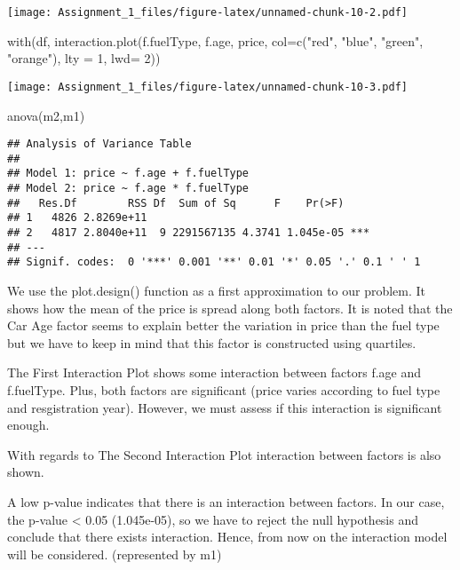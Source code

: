 \documentclass[
]{article}
\newenvironment{Shaded}{\begin{snugshade}}{\end{snugshade}}
\newcommand{\AttributeTok}[1]{\textcolor[rgb]{0.77,0.63,0.00}{#1}}
\newcommand{\DecValTok}[1]{\textcolor[rgb]{0.00,0.00,0.81}{#1}}
\newcommand{\FunctionTok}[1]{\textcolor[rgb]{0.00,0.00,0.00}{#1}}
\newcommand{\NormalTok}[1]{#1}
\newcommand{\StringTok}[1]{\textcolor[rgb]{0.31,0.60,0.02}{#1}}
\begin{document}
\texttt{[image: Assignment\_1\_files/figure-latex/unnamed-chunk-10-2.pdf]}

\begin{Shaded}
\begin{Highlighting}[]
\FunctionTok{with}\NormalTok{(df, }\FunctionTok{interaction.plot}\NormalTok{(f.fuelType, f.age, price,}
                          \AttributeTok{col=}\FunctionTok{c}\NormalTok{(}\StringTok{"red"}\NormalTok{, }\StringTok{"blue"}\NormalTok{, }\StringTok{"green"}\NormalTok{, }\StringTok{"orange"}\NormalTok{), }\AttributeTok{lty =} \DecValTok{1}\NormalTok{, }\AttributeTok{lwd=} \DecValTok{2}\NormalTok{))}
\end{Highlighting}
\end{Shaded}

\texttt{[image: Assignment\_1\_files/figure-latex/unnamed-chunk-10-3.pdf]}

\begin{Shaded}
\begin{Highlighting}[]
\FunctionTok{anova}\NormalTok{(m2,m1)}
\end{Highlighting}
\end{Shaded}

\begin{verbatim}
## Analysis of Variance Table
## 
## Model 1: price ~ f.age + f.fuelType
## Model 2: price ~ f.age * f.fuelType
##   Res.Df        RSS Df  Sum of Sq      F    Pr(>F)    
## 1   4826 2.8269e+11                                   
## 2   4817 2.8040e+11  9 2291567135 4.3741 1.045e-05 ***
## ---
## Signif. codes:  0 '***' 0.001 '**' 0.01 '*' 0.05 '.' 0.1 ' ' 1
\end{verbatim}

We use the plot.design() function as a first approximation to our
problem. It shows how the mean of the price is spread along both
factors. It is noted that the Car Age factor seems to explain better the
variation in price than the fuel type but we have to keep in mind that
this factor is constructed using quartiles.

The First Interaction Plot shows some interaction between factors f.age
and f.fuelType. Plus, both factors are significant (price varies
according to fuel type and resgistration year). However, we must assess
if this interaction is significant enough.

With regards to The Second Interaction Plot interaction between factors
is also shown.

A low p-value indicates that there is an interaction between factors. In
our case, the p-value \textless{} 0.05 (1.045e-05), so we have to reject
the null hypothesis and conclude that there exists interaction. Hence,
from now on the interaction model will be considered. (represented by
m1)
\end{document}
